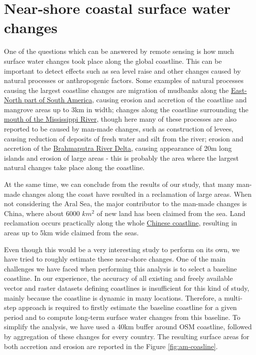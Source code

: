 \section{Near-shore coastal surface water changes}
One of the questions which can be answered by remote sensing is how much surface water changes took place along the global coastline. This can be important to detect effects such as sea level raise and other changes caused by natural processes or anthropogenic factors. Some examples of natural processes causing the largest coastline changes are migration of mudbanks along the \href{http://aqua-monitor.appspot.com/?from=2000&to=2016&view=5.37464731850053,-52.96134948730469,11z}{East-North part of South America}, causing erosion and accretion of the coastline and mangrove areas up to 3km in width; changes along the coastline surrounding the \href{http://aqua-monitor.appspot.com/?mode=dynamic&from=2000&to=2016&view=29.161696898682372,-89.24575805664062,11z}{mouth of the Mississippi River}, though here many of these processes are also reported to be caused by man-made changes, such as construction of levees, causing reduction of deposits of fresh water and silt from the river; erosion and accretion of the \href{http://aqua-monitor.appspot.com/?from=2000&to=2016&view=22.47760292118218,90.76316833496092,9z}{Brahmaputra River Delta}, causing appearance of 20m long islands and erosion of large areas - this is probably the area where the largest natural changes take place along the coastline. 

At the same time, we can conclude from the results of our study, that many man-made changes along the coast have resulted in a reclamation of large areas. When not considering the Aral Sea, the major contributor to the man-made changes is China, where about 6000 $km^2$ of new land has been claimed from the sea. Land reclamation occurs practically along the whole \href{http://aqua-monitor.appspot.com/?from=2000&to=2016&view=27.965842094147863,120.95462799072264,11z}{Chinese coastline}, resulting in areas up to 5km wide claimed from the seas.

Even though this would be a very interesting study to perform on its own, we have tried to roughly estimate these near-shore changes. One of the main challenges we have faced when performing this analysis is to select a baseline coastline. In our experience, the accuracy of all existing and freely available vector and raster datasets defining coastlines is insufficient for this kind of study, mainly because the coastline is dynamic in many locations. Therefore, a multi-step approach is required to firstly estimate the baseline coastline for a given period and to compute long-term surface water changes from this baseline. To simplify the analysis, we have used a 40km buffer around \gls{OSM} coastline, followed by aggregation of these changes for every country. The resulting surface areas for both accretion and erosion are reported in the Figure \ref{fig:am-coasline}.

